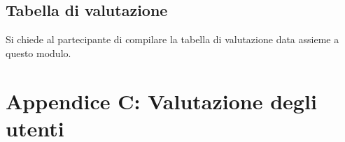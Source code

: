 \documentclass[11pt]{article}
\begin{document}
            \subsection*{Tabella di valutazione}
                Si chiede al partecipante di compilare la tabella di valutazione data assieme a questo modulo.
            
    \newpage
    \section*{Appendice C: Valutazione degli utenti}
\end{document}

